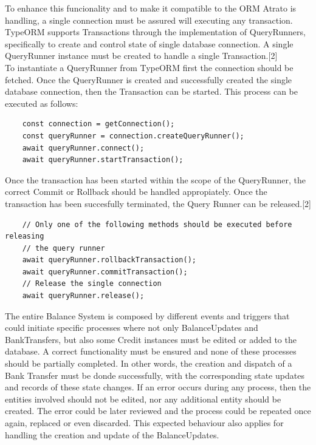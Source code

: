 To enhance this funcionality and to make it compatible to the ORM Atrato is handling, a single connection must be assured will executing any transaction. TypeORM supports Transactions through the implementation of QueryRunners, specifically to create and control state of single database connection. A single QueryRunner instance must be created to handle a single Transaction.[2]\\ 

To instantiate a QueryRunner from TypeORM first the connection should be fetched. Once the QueryRunner is created and successfully created the single database connection, then the Transaction can be started. This process can be executed as follows:

\begin{verbatim}
    const connection = getConnection();
    const queryRunner = connection.createQueryRunner();
    await queryRunner.connect();
    await queryRunner.startTransaction();
\end{verbatim}

Once the transaction has been started within the scope of the QueryRunner, the correct Commit or Rollback should be handled appropiately. Once the transaction has been succesfully terminated, the Query Runner can be released.[2]

\begin{verbatim}
    // Only one of the following methods should be executed before releasing
    // the query runner
    await queryRunner.rollbackTransaction();
    await queryRunner.commitTransaction();
    // Release the single connection
    await queryRunner.release();
\end{verbatim}

The entire Balance System is composed by different events and triggers that could initiate specific processes where not only BalanceUpdates and BankTransfers, but also some Credit instances must be edited or added to the database. A correct functionality must be ensured and none of these processes should be partially completed. In other words, the creation and dispatch of a Bank Transfer must be donde successfully, with the corresponding state updates and records of these state changes. If an error occurs during any process, then the entities involved should not be edited, nor any additional entity should be created. The error could be later reviewed and the process could be repeated once again, replaced or even discarded. This expected behaviour also applies for handling the creation and update of the BalanceUpdates.\\

